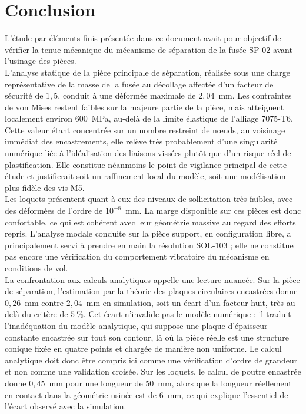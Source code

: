 \section*{Conclusion}

L'étude par éléments finis présentée dans ce document avait pour objectif de vérifier la
tenue mécanique du mécanisme de séparation de la fusée SP-02 avant l'usinage des pièces.\\

L'analyse statique de la pièce principale de séparation, réalisée sous une charge
représentative de la masse de la fusée au décollage affectée d'un facteur de sécurité de
$1,5$, conduit à une déformée maximale de $2,04$~mm. Les contraintes de von Mises restent
faibles sur la majeure partie de la pièce, mais atteignent localement environ $600$~MPa,
au-delà de la limite élastique de l'alliage 7075-T6. Cette valeur étant concentrée sur un
nombre restreint de nœuds, au voisinage immédiat des encastrements, elle relève très
probablement d'une singularité numérique liée à l'idéalisation des liaisons vissées plutôt
que d'un risque réel de plastification. Elle constitue néanmoins le point de vigilance
principal de cette étude et justifierait soit un raffinement local du modèle, soit une
modélisation plus fidèle des vis M5.\\

Les loquets présentent quant à eux des niveaux de sollicitation très faibles, avec des
déformées de l'ordre de $10^{-8}$~mm. La marge disponible sur ces pièces est donc
confortable, ce qui est cohérent avec leur géométrie massive au regard des efforts repris.
L'analyse modale conduite sur la pièce support, en configuration libre, a principalement
servi à prendre en main la résolution SOL-103 ; elle ne constitue pas encore une
vérification du comportement vibratoire du mécanisme en conditions de vol.\\

La confrontation aux calculs analytiques appelle une lecture nuancée. Sur la pièce de
séparation, l'estimation par la théorie des plaques circulaires encastrées donne
$0,26$~mm contre $2,04$~mm en simulation, soit un écart d'un facteur huit, très au-delà
du critère de $5~\%$. Cet écart n'invalide pas le modèle numérique : il traduit
l'inadéquation du modèle analytique, qui suppose une plaque d'épaisseur constante
encastrée sur tout son contour, là où la pièce réelle est une structure conique fixée en
quatre points et chargée de manière non uniforme. Le calcul analytique doit donc être
compris ici comme une vérification d'ordre de grandeur et non comme une validation
croisée. Sur les loquets, le calcul de poutre encastrée donne $0,45$~mm pour une longueur
de $50$~mm, alors que la longueur réellement en contact dans la géométrie usinée est de
$6$~mm, ce qui explique l'essentiel de l'écart observé avec la simulation.\\

